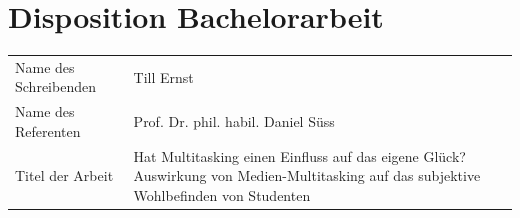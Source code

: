 %
%
\chapter*{Disposition Bachelorarbeit}\label{chap.dispo}
\glsresetall
\begin{tabularx}{17cm}{lX}
Name des Schreibenden & Till Ernst \\
Name des Referenten & Prof. Dr. phil. habil. Daniel Süss \\
Titel der Arbeit & Hat Multitasking einen Einfluss auf das eigene Glück? Auswirkung von Medien-Multitasking auf das subjektive Wohlbefinden von Studenten\\
\end{tabularx}

